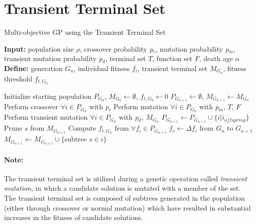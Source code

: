 \documentclass[a4paper]{article}
\begin{document}
\section{Transient Terminal Set}
\begin{algorithm}
	\caption{Multi-objective GP using the Transient Terminal Set}
	\hspace*{\algorithmicindent} \textbf{Input:} population size \(\rho\), crossover probability \textit{p$_{c}$}, mutation probability \textit{p$_{m}$}, transient mutation probability \textit{p$_{d}$}, terminal set \(T\), function set \(F\), death age \(\alpha\) \\
	\hspace*{\algorithmicindent} \textbf{Define:} generation \(G_{n}\), individual fitness \(f_{i}\), transient terminal set \(M_{G_{n}}\), fitness threshold \(f_{t, G_{n}}\) \\ 
	\begin{algorithmic}[1]
		\State Initialize starting population \textit{$ P_{G_{0}} $}, \(M_{G_{0}}\leftarrow \emptyset\), \(f_{t, G_{0}} \leftarrow 0\)
		 
		\State \(P_{G_{n+1}}\leftarrow \emptyset\), \(M_{G_{n+1}}\leftarrow M_{G_{n}}\)
			
		\State Perform crossover $\forall i\in P_{G_{n}}$ with \textit{p$_{c}$}
		\State Perform mutation $\forall i\in P_{G_{n}}$ with \textit{p$_{m}$}, \(T\), \(F\)
		\State Perform transient mutation $\forall i\in P_{G_{n}}$ with \textit{p$_{d}$, \(M_{G_{n}}\)}
		\State $P_{G_{n+1}} \leftarrow P_{G_{n+1}}\cup \{i | i_{offspring}\}$
		\EndWhile\newline
			
		\State Prune \(s\) from \(M_{G_{n+1}}\)
		\EndIf
		\EndFor
		\State Compute $f_{t, G_{n}}$ from $\forall f_{i} \in P_{G_{n+1}}$
		\State $f_{c}\leftarrow \Delta f_{i}$ from \(G_{n}\) to \(G_{n+1}\)
		\State \(M_{G_{n+1}} \leftarrow M_{G_{n+1}} \cup \{\)subtree \(s\in i \}\)
		\EndIf
		\EndFor 
		\EndWhile
\end{algorithmic}\end{algorithm}
\paragraph{Note:} The transient terminal set is utilized during a genetic operation called \textit{transient mutation}, in which a candidate solution is mutated with a member of the set. The transient terminal set is composed of subtrees generated in the population (either through crossover or normal mutation) which have resulted in substantial increases in the fitness of candidate solutions.
\end{document}
